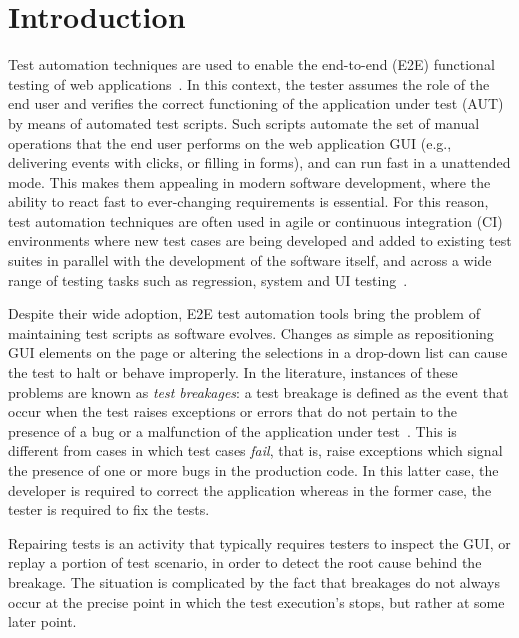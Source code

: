 \section{Introduction}\label{sec:introduction}

Test automation techniques are used to enable the end-to-end (E2E) functional testing of web applications~\cite{DBLP:journals/ac/TonellaRM14}. 
In this context, the tester assumes the role of the end user and verifies the correct functioning of the application under test (AUT) by means of automated test scripts. Such scripts automate the set of manual operations that the end user performs on the web application GUI (e.g., delivering events with clicks, or filling in forms), and can run fast in a unattended mode. This makes them appealing in modern software development, where the ability to react fast to ever-changing requirements is essential. For this reason, test automation techniques are often used in agile or continuous integration (CI) environments where new test cases are being developed and added to existing test suites in parallel with the development of the software itself, and across a wide range of testing tasks such as regression, system and UI testing~\cite{STVR:STVR121,Fewster,Ramler:2006:EPT:1138929.1138946,Nguyen2014,7381848}.


Despite their wide adoption, E2E test automation tools bring the problem of maintaining test scripts as software evolves. Changes as simple as repositioning GUI elements on the page or altering the selections in a drop-down list can cause the test to halt or behave improperly. 
In the literature, instances of these problems are known as \textit{test breakages}: a test breakage is defined as the event that occur when the test raises exceptions or errors that do not pertain to the presence of a bug or a malfunction of the application under test~\cite{Daniel:2011:AGR:2002931.2002937,Daniel:2009:RSR:1747491.1747538,Daniel:2010:TRU:1831708.1831734,Hammoudi-2016-ICST}. 
This is different from cases in which test cases \textit{fail}, that is, raise exceptions which signal the presence of one or more bugs in the production code. In this latter case, the developer is required to correct the application whereas in the former case, the tester is required to fix the tests. %


Repairing tests is an activity that typically requires testers to inspect the GUI, or replay a portion of test scenario, in order to detect the root cause behind the breakage. The situation is complicated by the fact that breakages do not always occur at the precise point in which the test execution's stops, but rather at some later point.

